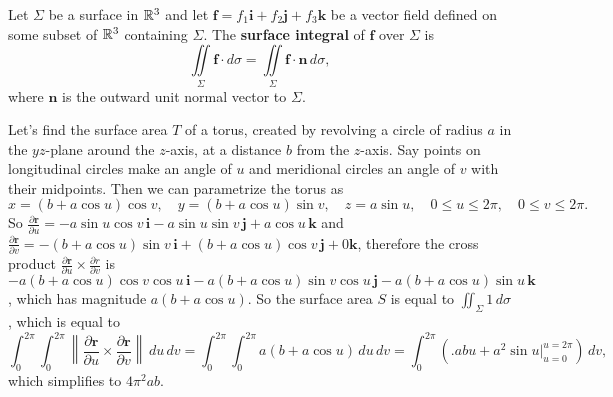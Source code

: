 \begin{definition}[]
    Let $\Sigma$ be a surface in $\mathbb{R}^3$ and let $\mathbf f=f_1 \mathbf i+f_2\mathbf j +f_3\mathbf k$ be a vector field defined on some subset of $\mathbb{R}^3$ containing $\Sigma$. The \textbf{surface integral} of $\mathbf f$ over $\Sigma$ is \[
    \iint\limits_{\Sigma}\mathbf f \cdot d\sigma = \iint\limits_{\Sigma}\mathbf f \cdot  \mathbf n \, d\sigma,
    \] where $\mathbf n$ is the outward unit normal vector to $\Sigma$.
\end{definition}


\begin{example}
    Let's find the surface area $T$ of a torus, created by revolving a circle of radius $a$ in the $yz$-plane around the $z$-axis, at a distance $b$ from the $z$-axis. Say points on longitudinal circles make an angle of $u$ and meridional circles an angle of $v$ with their midpoints. Then we can parametrize the torus as \[
        x=(b+a \cos u) \cos v, \quad y=(b+a \cos u)\sin v, \quad z= a \sin u, \quad 0\leq u \leq 2\pi, \quad 0\leq v \leq 2\pi.
    \] So $\frac{\partial \mathbf r}{\partial u}=-a \sin u \cos v \,\mathbf i - a \sin u \sin v \,\mathbf j+a \cos u \,\mathbf k$ and $\frac{\partial \mathbf r}{\partial v}=-(b+a \cos u ) \sin v \, \mathbf i+ (b+a \cos u) \cos v \,\mathbf j+0\mathbf k$, therefore the cross product $\frac{\partial \mathbf r}{\partial u}\times \frac{\partial r}{\partial v}$ is $-a(b+a \cos u) \cos v \cos u \, \mathbf i-a(b+a \cos u) \sin v \cos u \, \mathbf j-a(b+a \cos u) \sin u \, \mathbf k$, which has magnitude $a(b+a \cos u)$. So the surface area $S$ is equal to $\iint_{\Sigma}1\, d\sigma$, which is equal to \[
    \int_{0}^{2\pi} \int_{0}^{2\pi} \left\| \frac{\partial \mathbf r}{\partial u}\times \frac{\partial \mathbf r}{\partial v}\right\| \, du \, dv=\int_{0}^{2\pi} \int_{0}^{2\pi} a(b+a \cos u) \, du \, dv=\int_{0}^{2\pi} \left( \Big. abu+a^2\sin u \Big|_{u=0}^{u=2\pi} \right)  \, dv,
    \] which simplifies to $4\pi^2ab$.
\end{example}
